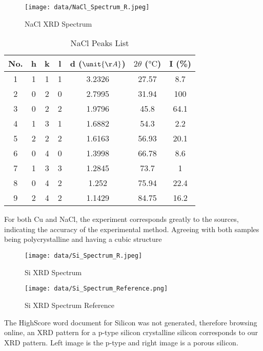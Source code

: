 \documentclass[11pt]{article}
\begin{document}
\clearpage
	
	\begin{figure}[!ht]
		\centering
		\texttt{[image: data/NaCl\_Spectrum\_R.jpeg]}
		\caption{NaCl XRD Spectrum}
	\end{figure}
	
	\begin{table}[!ht]
		\centering
		\caption{NaCl Peaks List}
		\begin{tabular}{ccccccc}
			\toprule
			No. & h & k & l & d ($\unit{\AA}$) & $2\theta$ ($\unit{\degreeCelsius}$) & I (\%) \\
			\midrule
			1 & 1 & 1 & 1 & 3.2326 & 27.57 & 8.7 \\
			2 & 0 & 2 & 0 & 2.7995 & 31.94 & 100 \\
			3 & 0 & 2 & 2 & 1.9796 & 45.8 & 64.1 \\
			4 & 1 & 3 & 1 & 1.6882 & 54.3 & 2.2 \\
			5 & 2 & 2 & 2 & 1.6163 & 56.93 & 20.1 \\
			6 & 0 & 4 & 0 & 1.3998 & 66.78 & 8.6 \\
			7 & 1 & 3 & 3 & 1.2845 & 73.7 & 1 \\
			8 & 0 & 4 & 2 & 1.252 & 75.94 & 22.4 \\
			9 & 2 & 4 & 2 & 1.1429 & 84.75 & 16.2 \\
			\bottomrule
		\end{tabular}%
		\label{tab:NaCl_Peaks}%
	\end{table}%
	
	For both Cu and NaCl, the experiment corresponds greatly to the sources, indicating the accuracy of the experimental method. Agreeing with both samples being polycrystalline and having a cubic structure
	
\clearpage
	
	\begin{figure}[!ht]
		\centering
		\texttt{[image: data/Si\_Spectrum\_R.jpeg]}
		\caption{Si XRD Spectrum}
	\end{figure}
	
	\begin{figure}[!ht]
		\centering
		\texttt{[image: data/Si\_Spectrum\_Reference.png]}
		\caption{Si XRD Spectrum Reference}
	\end{figure}
	
	The HighScore word document for Silicon was not generated, therefore browsing online, an XRD pattern for a p-type silicon crystalline silicon corresponds to our XRD pattern. Left image is the p-type and right image is a porous silicon.
	
\end{document}
